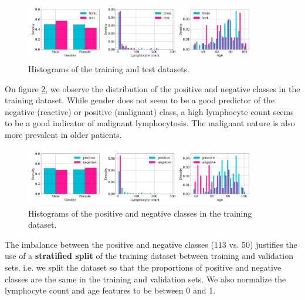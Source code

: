 \documentclass{midl}
\begin{document}
\begin{figure}[h]
    \centering
    \includegraphics[width=0.9\textwidth]{figures/train_test_histograms.png}
    \vspace*{-\baselineskip}
    \caption{Histograms of the training and test datasets.}
    \label{fig:train_test_histograms}
\end{figure}

On figure \ref{fig:positive_negative_histograms}, we observe the distribution of the positive and negative classes in the training dataset. While gender does not seem to be a good predictor of the negative (reactive) or positive (malignant) class, a high lymphocyte count seems to be a good indicator of malignant lymphocytosis. The malignant nature is also more prevalent in older patients.

\begin{figure}[h]
    \centering
    \includegraphics[width=0.9\textwidth]{figures/positive_negative_histograms.png}
    \vspace*{-\baselineskip}
    \caption{Histograms of the positive and negative classes in the training dataset.}
    \label{fig:positive_negative_histograms}
\end{figure}

The imbalance between the positive and negative classes (113 vs. 50) justifies the use of a \textbf{stratified split} of the training dataset between training and validation sets, i.e. we split the dataset so that the proportions of positive and negative classes are the same in the training and validation sets. We also normalize the lymphocyte count and age features to be between 0 and 1.
\end{document}
